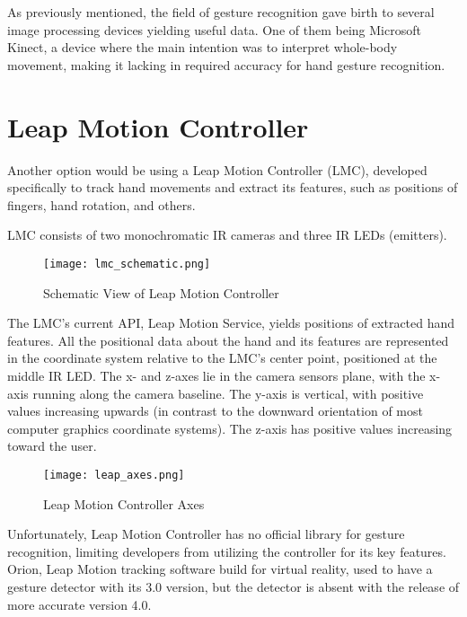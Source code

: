 As previously mentioned, the field of gesture recognition gave birth to several image processing devices yielding useful data. One of them being Microsoft Kinect, a device where the main intention was to interpret whole-body movement, making it lacking in required accuracy for hand gesture recognition. 

\section{Leap Motion Controller}
Another option would be using a Leap Motion Controller (LMC), developed specifically to track hand movements and extract its features, such as positions of fingers, hand rotation, and others.

LMC consists of two monochromatic IR cameras and three IR LEDs (emitters). 

\begin{figure}[h]
	\centering
    \texttt{[image: lmc\_schematic.png]}
	\caption{Schematic View of Leap Motion Controller}
	\label{fig:lmcScheme}
\end{figure}



The LMC's current API, Leap Motion Service, yields positions of extracted hand features. All the positional data about the hand and its features are represented in the coordinate system relative to the LMC's center point, positioned at the middle IR LED.\cite{LMCanalysis} The x- and z-axes lie in the camera sensors plane, with the x-axis running along the camera baseline. The y-axis is vertical, with positive values increasing upwards (in contrast to the downward orientation of most computer graphics coordinate systems). The z-axis has positive values increasing toward the user.\cite{tomasMultileap}

\begin{figure}[h]
	\centering
    \texttt{[image: leap\_axes.png]}
	\caption{Leap Motion Controller Axes}
	\label{fig:lmcScheme}
\end{figure}


Unfortunately, Leap Motion Controller has no official library for gesture recognition, limiting developers from utilizing the controller for its key features. Orion, Leap Motion tracking software build for virtual reality, used to have a gesture detector with its 3.0 version, but the detector is absent with the release of more accurate version 4.0.

